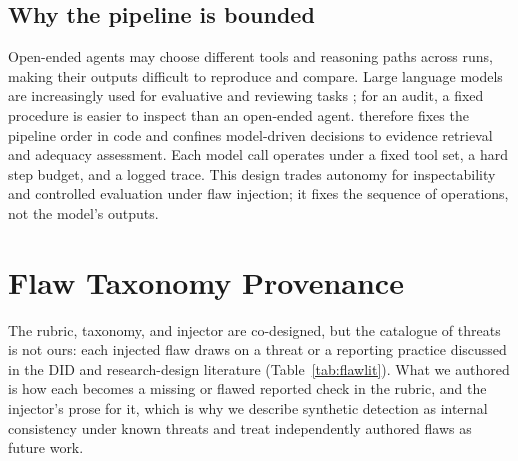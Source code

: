 \subsection{Why the pipeline is bounded}
Open-ended agents may choose different tools and reasoning paths across runs, making
their outputs difficult to reproduce and compare. Large language models are
increasingly used for evaluative and reviewing tasks
\cite{zheng2023judge,liang2024feedback,lu2024aiscientist}; for an audit, a fixed
procedure is easier to inspect than an open-ended agent. \sys{} therefore fixes the pipeline order in
code and confines model-driven decisions to evidence retrieval and adequacy
assessment. Each model call operates under a fixed tool set, a hard step budget, and
a logged trace. This design trades autonomy for inspectability and controlled
evaluation under flaw injection; it fixes the sequence of operations, not the
model's outputs.

\section{Flaw Taxonomy Provenance}
\label{app:flawlit}
The rubric, taxonomy, and injector are co-designed, but the catalogue of
threats is not ours: each injected flaw draws on a threat or a reporting
practice discussed in the DID and research-design literature
(Table~\ref{tab:flawlit}). What we authored is how each becomes a missing or
flawed reported check in the rubric, and the injector's prose for it, which is why we describe synthetic detection
as internal consistency under known threats and treat independently authored
flaws as future work.

